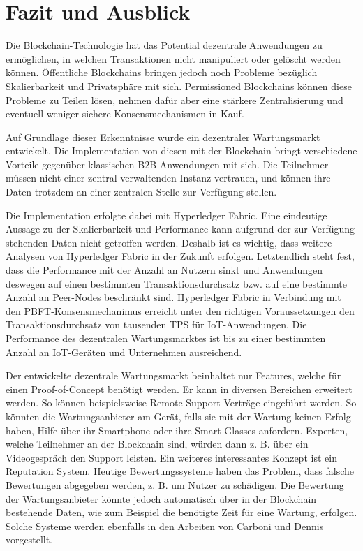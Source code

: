 \chapter{Fazit und Ausblick}
\label{cha:fazit}

Die Blockchain-Technologie hat das Potential dezentrale Anwendungen zu ermöglichen, in welchen Transaktionen nicht manipuliert oder gelöscht werden können. Öffentliche Blockchains bringen jedoch noch Probleme bezüglich Skalierbarkeit und Privatsphäre mit sich. Permissioned Blockchains können diese Probleme zu Teilen lösen, nehmen dafür aber eine stärkere Zentralisierung und eventuell weniger sichere Konsensmechanismen in Kauf. 

Auf Grundlage dieser Erkenntnisse wurde ein dezentraler Wartungsmarkt entwickelt. Die Implementation von diesen mit der Blockchain bringt verschiedene Vorteile gegenüber klassischen B2B-Anwendungen mit sich. Die Teilnehmer müssen nicht einer zentral verwaltenden Instanz vertrauen, und können ihre Daten trotzdem an einer zentralen Stelle zur Verfügung stellen.

Die Implementation erfolgte dabei mit Hyperledger Fabric. Eine eindeutige Aussage zu der Skalierbarkeit und Performance kann aufgrund der zur Verfügung stehenden Daten nicht getroffen werden. Deshalb ist es wichtig, dass weitere Analysen von Hyperledger Fabric in der Zukunft erfolgen. Letztendlich steht fest, dass die Performance mit der Anzahl an Nutzern sinkt und Anwendungen deswegen auf einen bestimmten Transaktionsdurchsatz bzw. auf eine bestimmte Anzahl an Peer-Nodes beschränkt sind. Hyperledger Fabric in Verbindung mit den PBFT-Konsensmechanimus erreicht unter den richtigen Voraussetzungen den Transaktionsdurchsatz von tausenden \acs{TPS} für IoT-Anwendungen. Die Performance des dezentralen Wartungsmarktes ist bis zu einer bestimmten Anzahl an IoT-Geräten und Unternehmen ausreichend.

Der entwickelte dezentrale Wartungsmarkt beinhaltet nur Features, welche für einen Proof-of-Concept benötigt werden. Er kann in diversen Bereichen erweitert werden. So können beispielsweise Remote-Support-Verträge eingeführt werden. So könnten die Wartungsanbieter am Gerät, falls sie mit der Wartung keinen Erfolg haben, Hilfe über ihr Smartphone oder ihre Smart Glasses anfordern. Experten, welche Teilnehmer an der Blockchain sind, würden dann z. B. über ein Videogespräch den Support leisten. Ein weiteres interessantes Konzept ist ein Reputation System. Heutige Bewertungssysteme haben das Problem, dass falsche Bewertungen abgegeben werden, z. B. um Nutzer zu schädigen. Die Bewertung der Wartungsanbieter könnte jedoch automatisch über in der Blockchain bestehende Daten, wie zum Beispiel die benötigte Zeit für eine Wartung, erfolgen. Solche Systeme werden ebenfalls in den Arbeiten von Carboni \cite{CarboniFeedbackbasedReputation2015} und Dennis \cite{DennisRepblocknext2015} vorgestellt.

